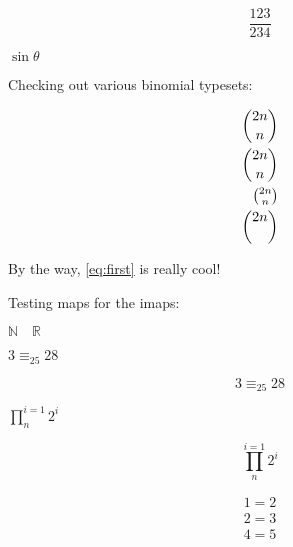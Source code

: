 \documentclass{article}
\begin{document}
\begin{equation}
    \frac{123}{234}
\end{equation}

$\sin\theta$

Checking out various binomial typesets:

\begin{equation}
\begin{split}
    \binom{2n}{n} \\
    \dbinom{2n}{n} \\
    \tbinom{2n}{n} \\
    \dbinom{2n}{}
\end{split}
\end{equation}

By the way, \ref{eq:first} is really cool!

Testing maps for the imaps:

$\mathbb{N}\quad\mathbb{R}$

$3\equiv_{25}28$

\begin{equation}
3\equiv_{25}28
\end{equation}


$\prod_{n}^{i=1}2^{i}$

\begin{equation}
\prod_{n}^{i=1}2^{i}
\end{equation}


\begin{subequations}
\begin{align}
1 = 2 \\
2 = 3 \\
4 = 5
\end{align}
\end{subequations}

\end{document}
